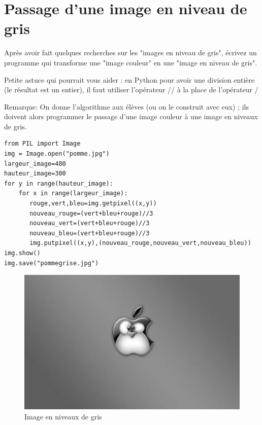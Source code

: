 \documentclass[11pt]{article}
\begin{document}
\section{Passage d'une image en niveau de gris}
\label{sec:orgfd80acc}

Après avoir fait quelques recherches sur les "images en niveau de gris", écrivez un programme qui transforme une "image couleur" en une "image en niveau de gris".

Petite astuce qui pourrait vous aider : en Python pour avoir une division entière (le résultat est un entier), il faut utiliser l'opérateur // à la place de l'opérateur / 

Remarque: On donne l'algorithme aux élèves (ou on le construit avec eux) ; ils doivent alors programmer le passage d'une image couleur à une image en niveaux de gris.


\begin{verbatim}
from PIL import Image
img = Image.open("pomme.jpg")
largeur_image=480
hauteur_image=300
for y in range(hauteur_image):
    for x in range(largeur_image):
       rouge,vert,bleu=img.getpixel((x,y))
       nouveau_rouge=(vert+bleu+rouge)//3
       nouveau_vert=(vert+bleu+rouge)//3
       nouveau_bleu=(vert+bleu+rouge)//3
       img.putpixel((x,y),(nouveau_rouge,nouveau_vert,nouveau_bleu))
img.show()
img.save("pommegrise.jpg")
\end{verbatim}

\begin{figure}[htbp]
\centering
\includegraphics[width=.9\linewidth]{pommegrise.jpg}
\caption{Image en niveaux de gris}
\end{figure}
\end{document}
